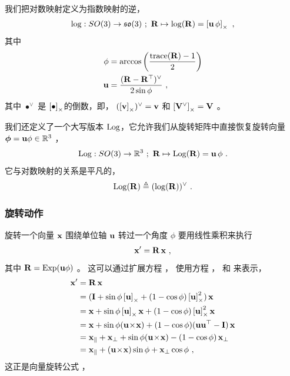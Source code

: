 我们把对数映射定义为指数映射的逆，
%
\begin{align}
\log : SO(3)\to{\mathfrak {so}}(3)~;~ {\bf R} \mapsto \log({\bf R})=\left[{\bf u}\,\phi\right]_\times
~,
\end{align}
%
其中
%
\begin{align}
\phi &= \arccos\left(\frac{\operatorname*{trace}({\bf R})-1}{2}\right) 
\\
{\bf u} &= \frac{({\bf R}-{\bf R}^{\top})^\vee}{2\sin\phi} 
~,
\end{align}
%
其中 $\bullet^\vee$ 是 $\left[\bullet\right]_\times$的倒数，即， $(\left[{\bf v}\right]_\times)^\vee={\bf v}$ 和 $\left[{\bf V}^\vee\right]_\times={\bf V}$ 。

我们还定义了一个大写版本 $\operatorname*{Log}$，它允许我们从旋转矩阵中直接恢复旋转向量 ${\bm \phi}={\bf u}\phi\in{\mathbb R}^3$ ， 
%
\begin{subequations}
\begin{align}
\operatorname*{Log}: SO(3) \to {\mathbb R}^3 ~;~ {\bf R}\mapsto\operatorname*{Log}({\bf R}) = {\bf u}\,\phi 
~.
\end{align}
\end{subequations}
%
它与对数映射的关系是平凡的，
%
\begin{align}
\operatorname*{Log}({\bf R}) \triangleq (\log({\bf R}))^\vee
~.
\end{align}



\subsubsection{旋转动作}

旋转一个向量 ${\bf x}$ 围绕单位轴 ${\bf u}$ 转过一个角度 $\phi$ %
要用线性乘积来执行
%
\begin{align}
{\bf x}'={\bf R}\,{\bf x}
~, 
\label{equ:rotWithMat}
\end{align}
%
其中 ${\bf R}=\operatorname*{Exp}({\bf u}\phi)$ 。
这可以通过扩展方程  ，
使用方程  ，   和  来表示，
%
\begin{align}
\begin{split}
{\bf x}' &= {\bf R}\,{\bf x}  \\
&= ({\bf I} + \sin\phi\left[{\bf u}\right]_\times + (1-\cos\phi)\left[{\bf u}\right]_\times^2)\,{\bf x}  \\
&= {\bf x} + \sin\phi\left[{\bf u}\right]_\times{\bf x} + (1-\cos\phi)\left[{\bf u}\right]_\times^2{\bf x}  \\
&= {\bf x} + \sin\phi({\bf u}\!\times\!{\bf x}) + (1-\cos\phi)({\bf u}{\bf u}^{\top}-{\bf I})\,{\bf x}  \\
&= {\bf x}_\| + {\bf x}_\bot + \sin\phi({\bf u}\!\times\!{\bf x}) - (1-\cos\phi)\,{\bf x}_\bot  \\
&= {\bf x}_\| + ({\bf u}\!\times\!{\bf x})\sin\phi + {\bf x}_\bot\cos\phi
~,
\end{split}
\end{align}%
%
这正是向量旋转公式  ，


